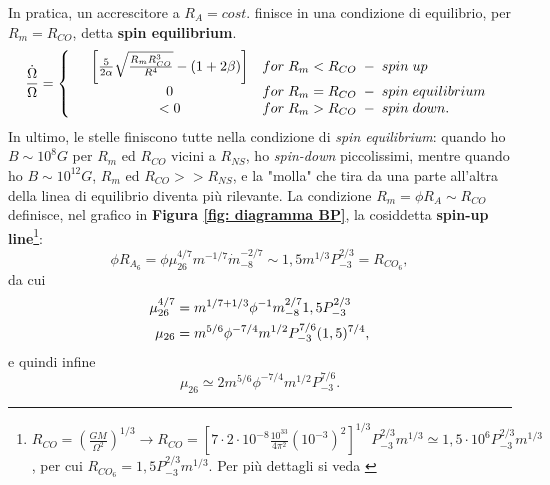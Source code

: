 In pratica, un accrescitore a $R_A=cost.$ finisce in una condizione di equilibrio, per $R_m=R_{CO}$, detta \textbf{spin equilibrium}.
\begin{equation}
    \frac{\dot{\Omega}}{\Omega} = \left\{
    \begin{array}{rcl}
       &\left[ \frac{5}{2\alpha}\sqrt{\frac{R_mR_{CO}^3}{R^4}} - (1+2\beta) \right]  & for \hspace{1mm} R_m<R_{CO} \hspace{1mm } -  \hspace{1mm } spin  \hspace{1mm }  up\\
       &0  & for \hspace{1mm} R_m=R_{CO} \hspace{1mm } -  \hspace{1mm } spin  \hspace{1mm }  equilibrium \\
       &<0  & for \hspace{1mm} R_m>R_{CO}\hspace{1mm } -  \hspace{1mm } spin  \hspace{1mm }  down.
    \end{array}
    \right.
\end{equation}
In ultimo, le stelle finiscono tutte nella condizione di \textit{spin equilibrium}: quando ho $B\sim10^8G$ per $R_m$ ed $R_{CO} $ vicini a $ R_{NS} $, ho \textit{spin-down} piccolissimi, mentre quando ho $B\sim10^{12}G$, $R_m $ ed $ R_{CO}>>R_{NS} $, e la "molla" che tira da una parte all'altra della linea di equilibrio diventa più rilevante.
La condizione $R_m = \phi R_A \sim R_{CO} $ definisce, nel grafico in \textbf{Figura \ref{fig: diagramma BP}}, la cosiddetta \textbf{spin-up line}\footnote{$R_{CO}=\left( \frac{GM}{\Omega^2} \right)^{1/3} \xrightarrow{} R_{CO} =\left[ 7\cdot2\cdot10^{-8}\frac{10^{33}}{4\pi^2}(10^{-3})^{2} \right]^{1/3}P_{-3}^{2/3}m^{1/3}\simeq 1,5\cdot10^6 P_{-3}^{2/3}m^{1/3} $, per cui $R_{CO_6} = 1,5P_{-3}^{2/3}m^{1/3} $. Per più dettagli si veda \cite{Bhattacharya}}:
\begin{equation}
    \phi R_{A_6} = \phi\mu_{26}^{4/7}m^{-1/7}\dot{m}_{-8}^{-2/7}\sim 1,5 m^{1/3}P_{-3}^{2/3}=R_{CO_6},
\end{equation}
da cui 
\begin{align}
    \mu_{26}^{4/7} & =  m^{1/7 + 1/3}\phi^{-1}m_{-8}^{2/7}1,5P_{-3}^{2/3}\notag\\
    \mu_{26} & =  m^{5/6}\phi^{-7/4}m^{1/2}P_{-3}^{7/6}(1,5)^{7/4}\notag,
\end{align}
e quindi infine
\begin{equation}
    \boxed{\mu_{26} \simeq 2m^{5/6}\phi^{-7/4}m^{1/2}P_{-3}^{7/6}}.
    \label{eq: spin-up line}
\end{equation}

